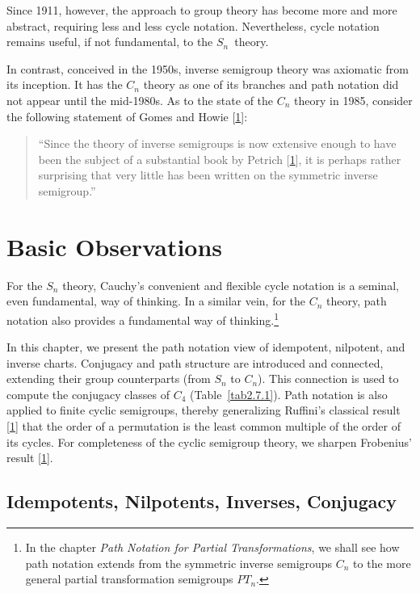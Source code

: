 \documentclass{surv-l}
\numberwithin{equation}{section}
\numberwithin{table}{section}
\numberwithin{figure}{section}
\theoremstyle{definition}
\begin{document}
Since 1911, however, the approach to group theory has become more
and more abstract, requiring less and less cycle notation.
Nevertheless, cycle notation remains useful, if not fundamental,
to the $S_{n}$~theory.

In contrast, conceived in the 1950s, inverse semigroup theory was
axiomatic from its inception. It has the $C_{n}$ theory as one of
its branches and path notation did not appear until the mid-1980s.
As to the state of the $C_{n}$ theory in 1985, consider the
following statement of Gomes and
Howie [\hyperlink{bib22}{1}]:
\begin{quote}
``Since the theory of inverse semigroups is now extensive enough
to have been the subject of a substantial book by Petrich
[\hyperlink{bib60}{1}], it is perhaps rather surprising
that very little has been written on the symmetric inverse
semigroup.''
\end{quote}

\chapter{Basic Observations}\label{chap2}

For the $S_{n}$ theory, Cauchy's convenient and flexible cycle
notation is a seminal, even fundamental, way of thinking. In a
similar vein, for the $C_{n}$ theory, path notation also provides
a fundamental way of thinking.\footnote{In the chapter \emph{Path
Notation for Partial Transformations}, we shall see how path
notation extends from the symmetric inverse semigroups $C_{n}$ to
the more general partial transformation semigroups $PT_{n}$.}

In this chapter, we present the path notation view of idempotent,
nilpotent, and inverse charts. Conjugacy and path structure are
introduced and connected, extending their group counterparts (from
$S_{n}$ to $C_{n}$). This connection is used to compute the
conjugacy classes of $C_{4}$ (Table~\ref{tab2.7.1}). Path notation
is also applied to finite cyclic semigroups, thereby generalizing
Ruffini's classical result [\hyperlink{bib66}{1}] that
the order of a permutation is the least common multiple of the
order of its cycles. For completeness of the cyclic semigroup
theory, we sharpen Frobenius' result [\hyperlink{bib17}{1}].

\setcounter{section}{4}
\section{Idempotents, Nilpotents, Inverses, Conjugacy}\label{sec2.5}
\end{document}
